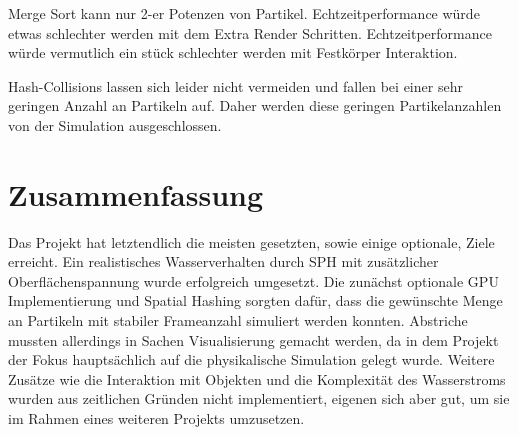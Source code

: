 \documentclass[a4paper]{paper}
\begin{document}
Merge Sort kann nur 2-er Potenzen von Partikel.
Echtzeitperformance würde etwas schlechter werden mit dem Extra Render Schritten.
Echtzeitperformance würde vermutlich ein stück schlechter werden mit Festkörper Interaktion. 


Hash-Collisions lassen sich leider nicht vermeiden und fallen bei einer sehr geringen Anzahl an Partikeln auf. Daher werden diese geringen Partikelanzahlen von der Simulation ausgeschlossen.
\section{Zusammenfassung}

Das Projekt hat letztendlich die meisten gesetzten, sowie einige optionale, Ziele erreicht. Ein realistisches Wasserverhalten durch SPH mit zusätzlicher Oberflächenspannung wurde erfolgreich umgesetzt. Die zunächst optionale GPU Implementierung und Spatial Hashing sorgten dafür, dass die gewünschte Menge an Partikeln mit stabiler Frameanzahl simuliert werden konnten. Abstriche mussten allerdings in Sachen Visualisierung gemacht werden, da in dem Projekt der Fokus hauptsächlich auf die physikalische Simulation gelegt wurde. Weitere Zusätze wie die Interaktion mit Objekten und die Komplexität des Wasserstroms wurden aus zeitlichen Gründen nicht implementiert, eigenen sich aber gut, um sie im Rahmen eines weiteren Projekts umzusetzen.




\end{document}
